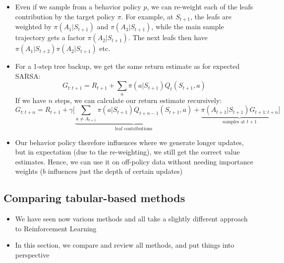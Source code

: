 \begin{itemize}
\begin{figure}[ht!]
		\label{fig:rl_tabular_methods_n_step_tree_backup}
	\end{figure}
	\item Even if we sample from a behavior policy $p$, we can re-weight each of the leafs contribution by the target policy $\pi$. For example, at $S_{t+1}$, the leafs are weighted by $\pi(A_1|S_{t+1})$ and $\pi(A_3|S_{t+1})$, while the main sample trajectory gets a factor $\pi(A_2|S_{t+1})$. The next leafs then have $\pi(A_1|S_{t+2})\pi(A_2|S_{t+1})$ etc.
	\item For a 1-step tree backup, we get the same return estimate as for expected SARSA:
	$$G_{t:t+1}=R_{t+1}+\sum_a \pi(a|S_{t+1})Q_t(S_{t+1},a)$$
	If we have $n$ steps, we can calculate our return estimate recursively:
	$$G_{t:t+n}=R_{t+1}+ \gamma\Bigg[\underbrace{\sum_{a\neq A_{t+1}} \pi(a|S_{t+1})Q_{t+n-1}(S_{t+1},a)}_{\text{leaf contributions}} + \underbrace{\pi(A_{t+1}|S_{t+1})G_{t+1:t+n}}_{\text{samples at }t+1}\Bigg]$$
	\item Our behavior policy therefore influences where we generate longer updates, but in expectation (due to the re-weighting), we still get the correct value estimates. Hence, we can use it on off-policy data without needing importance weights ($b$ influences just the depth of certain updates)
\end{itemize}

\subsection{Comparing tabular-based methods}
\begin{itemize}
	\item We have seen now various methods and all take a slightly different approach to Reinforcement Learning
	\item In this section, we compare and review all methods, and put things into perspective
\end{itemize}
